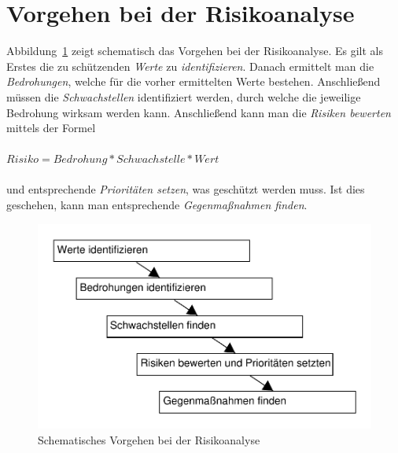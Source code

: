 \section{Vorgehen bei der Risikoanalyse}

Abbildung~\ref{5analysestufen} zeigt schematisch das Vorgehen bei der Risikoanalyse. Es gilt als Erstes die zu schützenden \textit{Werte} zu \textit{identifizieren}. Danach ermittelt man die \textit{Bedrohungen}, welche für die vorher ermittelten Werte bestehen. Anschließend müssen die \textit{Schwachstellen} identifiziert werden, durch welche die jeweilige Bedrohung wirksam werden kann. Anschließend kann man die \textit{Risiken bewerten} mittels der Formel
\\\\
$ Risiko = Bedrohung * Schwachstelle * Wert $
\\\\
und entsprechende \textit{Prioritäten setzen}, was geschützt werden muss. Ist dies geschehen, kann man entsprechende \textit{Gegenmaßnahmen finden}.

\begin{figure}[h]
\includegraphics[scale=0.8]{images/5analysestufen.pdf}
\caption{Schematisches Vorgehen bei der Risikoanalyse}
\label{5analysestufen}
\end{figure}


